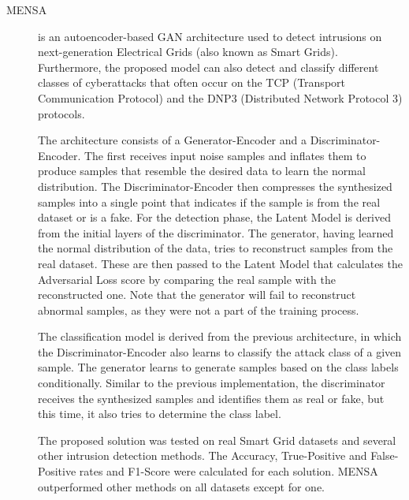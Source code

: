 \begin{description}
    \item[MENSA \cite{siniosoglou.etal_UnifiedDeepLearning_2021}] is an autoencoder-based GAN architecture used to detect intrusions on next-generation Electrical Grids (also known as Smart Grids). Furthermore, the proposed model can also detect and classify different classes of cyberattacks that often occur on the TCP (Transport Communication Protocol) and the DNP3 (Distributed Network Protocol 3) protocols.

    The architecture consists of a Generator-Encoder and a Discriminator-Encoder. The first receives input noise samples and inflates them to produce samples that resemble the desired data to learn the normal distribution. The Discriminator-Encoder then compresses the synthesized samples into a single point that indicates if the sample is from the real dataset or is a fake. For the detection phase, the Latent Model is derived from the initial layers of the discriminator. The generator, having learned the normal distribution of the data, tries to reconstruct samples from the real dataset. These are then passed to the Latent Model that calculates the Adversarial Loss score by comparing the real sample with the reconstructed one. Note that the generator will fail to reconstruct abnormal samples, as they were not a part of the training process.

    The classification model is derived from the previous architecture, in which the Discriminator-Encoder also learns to classify the attack class of a given sample. The generator learns to generate samples based on the class labels conditionally. Similar to the previous implementation, the discriminator receives the synthesized samples and identifies them as real or fake, but this time, it also tries to determine the class label.  

    The proposed solution was tested on real Smart Grid datasets and several other intrusion detection methods. The Accuracy, True-Positive and False-Positive rates and F1-Score were calculated for each solution. MENSA outperformed other methods on all datasets except for one.
\end{description}



